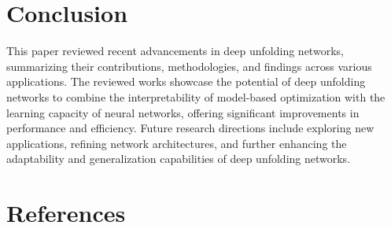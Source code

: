 \documentclass[11pt]{article}
\begin{document}
\section{Conclusion}
This paper reviewed recent advancements in deep unfolding networks, summarizing their contributions, methodologies, and findings across various applications. The reviewed works showcase the potential of deep unfolding networks to combine the interpretability of model-based optimization with the learning capacity of neural networks, offering significant improvements in performance and efficiency. Future research directions include exploring new applications, refining network architectures, and further enhancing the adaptability and generalization capabilities of deep unfolding networks.

\section{References}


\end{document}
